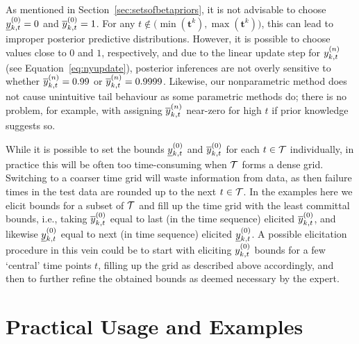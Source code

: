 \documentclass[12pt, a4paper]{elsarticle}
\newcommand{\bs}[1]{\boldsymbol{#1}}
\renewcommand{\vec}[1]{{\bs#1}}
\newcommand{\Rsys}{R_\text{sys}}
\begin{document}
As mentioned in Section~\ref{sec:setsofbetapriors},
it is not advisable to choose $\underline{y}^{(0)}_{k,t} = 0$ and $\overline{y}^{(0)}_{k,t} = 1$.
For any $t \not\in \big(\min(\vec{t}^k), \max(\vec{t}^k)\big)$,
this can lead to improper posterior predictive distributions.
However, it is possible to choose values close to $0$ and $1$, respectively,
and due to the linear update step for $y^{(n)}_{k,t}$ (see Equation~\eqref{eq:nyupdate}),
posterior inferences are not overly sensitive to whether $\overline{y}^{(n)}_{k,t} = 0.99$ or $\overline{y}^{(n)}_{k,t} = 0.9999$.
Likewise, our nonparametric method does not cause unintuitive tail behaviour
as some parametric methods do;
there is no problem, for example, with assigning $\overline{y}^{(n)}_{k,t}$ near-zero for high $t$ if prior knowledge suggests so.

While it is possible to set the bounds $\underline{y}^{(0)}_{k,t}$ and $\overline{y}^{(0)}_{k,t}$ for each $t \in {\cal T}$ individually,
in practice this will be often too time-consuming when ${\cal T}$ forms a dense grid.
Switching to a coarser time grid will waste information from data,
as then failure times in the test data are rounded up to the next $t \in {\cal T}$.
In the examples here we elicit bounds for a subset of ${\cal T}$
and fill up the time grid with the least committal bounds, i.e.,
taking $\overline{y}^{(0)}_{k,t}$ equal to last (in the time sequence) elicited $\overline{y}^{(0)}_{k,t}$,
and likewise $\underline{y}^{(0)}_{k,t}$ equal to next (in time sequence) elicited $\underline{y}^{(0)}_{k,t}$.
A possible elicitation procedure in this vein could be
to start with eliciting $y^{(0)}_{k,t}$ bounds for a few `central' time points $t$,
filling up the grid as described above accordingly,
and then to further refine the obtained bounds as deemed necessary by the expert.


\section{Practical Usage and Examples}
\end{document}
